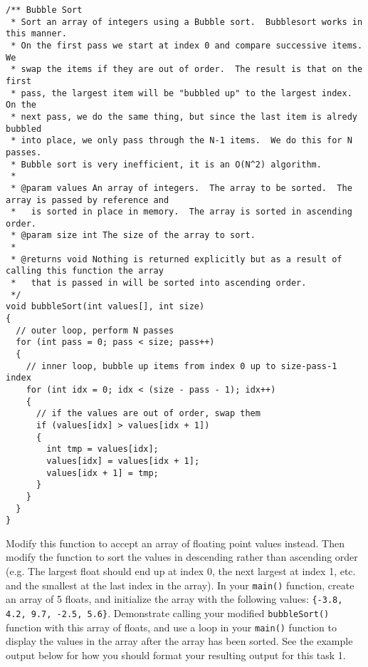 \documentclass[11pt]{article}
\begin{document}
\begin{verbatim}
/** Bubble Sort
 * Sort an array of integers using a Bubble sort.  Bubblesort works in this manner.
 * On the first pass we start at index 0 and compare successive items.  We
 * swap the items if they are out of order.  The result is that on the first
 * pass, the largest item will be "bubbled up" to the largest index.  On the
 * next pass, we do the same thing, but since the last item is alredy bubbled
 * into place, we only pass through the N-1 items.  We do this for N passes.
 * Bubble sort is very inefficient, it is an O(N^2) algorithm.
 *
 * @param values An array of integers.  The array to be sorted.  The array is passed by reference and
 *   is sorted in place in memory.  The array is sorted in ascending order.
 * @param size int The size of the array to sort.
 *
 * @returns void Nothing is returned explicitly but as a result of calling this function the array
 *   that is passed in will be sorted into ascending order.
 */
void bubbleSort(int values[], int size)
{
  // outer loop, perform N passes
  for (int pass = 0; pass < size; pass++)
  {
    // inner loop, bubble up items from index 0 up to size-pass-1 index
    for (int idx = 0; idx < (size - pass - 1); idx++)
    {
      // if the values are out of order, swap them
      if (values[idx] > values[idx + 1])
      {
        int tmp = values[idx];
        values[idx] = values[idx + 1];
        values[idx + 1] = tmp;
      }
    }
  }
}
\end{verbatim}
   Modify this function to accept an array of floating point values
   instead.  Then modify the function to sort the values in descending
   rather than ascending order (e.g. The largest float should end up
   at index 0, the next largest at index 1, etc. and the smallest at
   the last index in the array).  In your \verb~main()~ function, create an
   array of 5 floats, and initialize the array with the following
   values: \verb~{-3.8, 4.2, 9.7, -2.5, 5.6}~.  Demonstrate calling your
   modified \verb~bubbleSort()~ function with this array of floats, and use
   a loop in your \verb~main()~ function to display the values in the array
   after the array has been sorted.  See the example output below for
   how you should format your resulting output for this task 1.
\end{document}

